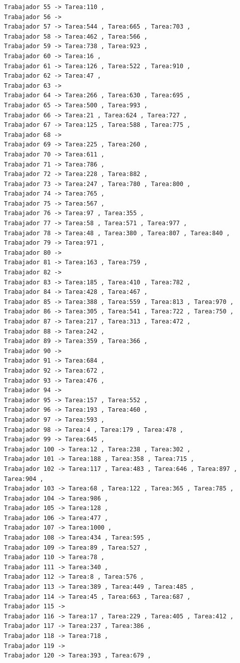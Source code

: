 \documentclass{article}
\begin{document}
\begin{lstlisting}
Trabajador 55 -> Tarea:110 , 
Trabajador 56 -> 
Trabajador 57 -> Tarea:544 , Tarea:665 , Tarea:703 , 
Trabajador 58 -> Tarea:462 , Tarea:566 , 
Trabajador 59 -> Tarea:738 , Tarea:923 , 
Trabajador 60 -> Tarea:16 , 
Trabajador 61 -> Tarea:126 , Tarea:522 , Tarea:910 , 
Trabajador 62 -> Tarea:47 , 
Trabajador 63 -> 
Trabajador 64 -> Tarea:266 , Tarea:630 , Tarea:695 , 
Trabajador 65 -> Tarea:500 , Tarea:993 , 
Trabajador 66 -> Tarea:21 , Tarea:624 , Tarea:727 , 
Trabajador 67 -> Tarea:125 , Tarea:588 , Tarea:775 , 
Trabajador 68 -> 
Trabajador 69 -> Tarea:225 , Tarea:260 , 
Trabajador 70 -> Tarea:611 , 
Trabajador 71 -> Tarea:786 , 
Trabajador 72 -> Tarea:228 , Tarea:882 , 
Trabajador 73 -> Tarea:247 , Tarea:780 , Tarea:800 , 
Trabajador 74 -> Tarea:765 , 
Trabajador 75 -> Tarea:567 , 
Trabajador 76 -> Tarea:97 , Tarea:355 , 
Trabajador 77 -> Tarea:58 , Tarea:571 , Tarea:977 , 
Trabajador 78 -> Tarea:48 , Tarea:380 , Tarea:807 , Tarea:840 , 
Trabajador 79 -> Tarea:971 , 
Trabajador 80 -> 
Trabajador 81 -> Tarea:163 , Tarea:759 , 
Trabajador 82 -> 
Trabajador 83 -> Tarea:185 , Tarea:410 , Tarea:782 , 
Trabajador 84 -> Tarea:428 , Tarea:467 , 
Trabajador 85 -> Tarea:388 , Tarea:559 , Tarea:813 , Tarea:970 , 
Trabajador 86 -> Tarea:305 , Tarea:541 , Tarea:722 , Tarea:750 , 
Trabajador 87 -> Tarea:217 , Tarea:313 , Tarea:472 , 
Trabajador 88 -> Tarea:242 , 
Trabajador 89 -> Tarea:359 , Tarea:366 , 
Trabajador 90 -> 
Trabajador 91 -> Tarea:684 , 
Trabajador 92 -> Tarea:672 , 
Trabajador 93 -> Tarea:476 , 
Trabajador 94 -> 
Trabajador 95 -> Tarea:157 , Tarea:552 , 
Trabajador 96 -> Tarea:193 , Tarea:460 , 
Trabajador 97 -> Tarea:593 , 
Trabajador 98 -> Tarea:4 , Tarea:179 , Tarea:478 , 
Trabajador 99 -> Tarea:645 , 
Trabajador 100 -> Tarea:12 , Tarea:238 , Tarea:302 , 
Trabajador 101 -> Tarea:188 , Tarea:358 , Tarea:715 , 
Trabajador 102 -> Tarea:117 , Tarea:483 , Tarea:646 , Tarea:897 , Tarea:904 , 
Trabajador 103 -> Tarea:68 , Tarea:122 , Tarea:365 , Tarea:785 , 
Trabajador 104 -> Tarea:986 , 
Trabajador 105 -> Tarea:128 , 
Trabajador 106 -> Tarea:477 , 
Trabajador 107 -> Tarea:1000 , 
Trabajador 108 -> Tarea:434 , Tarea:595 , 
Trabajador 109 -> Tarea:89 , Tarea:527 , 
Trabajador 110 -> Tarea:78 , 
Trabajador 111 -> Tarea:340 , 
Trabajador 112 -> Tarea:8 , Tarea:576 , 
Trabajador 113 -> Tarea:389 , Tarea:449 , Tarea:485 , 
Trabajador 114 -> Tarea:45 , Tarea:663 , Tarea:687 , 
Trabajador 115 -> 
Trabajador 116 -> Tarea:17 , Tarea:229 , Tarea:405 , Tarea:412 , 
Trabajador 117 -> Tarea:237 , Tarea:386 , 
Trabajador 118 -> Tarea:718 , 
Trabajador 119 -> 
Trabajador 120 -> Tarea:393 , Tarea:679 , 

\end{lstlisting}
\end{document}
